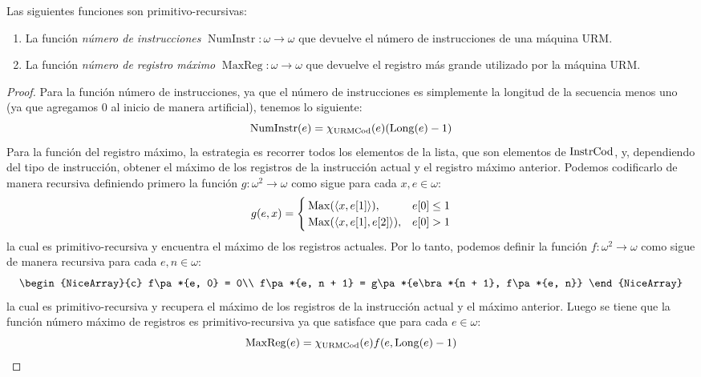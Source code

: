 \begin{theorem}
	\label{theo: numinstr_maxreg_primitivas} %
	Las siguientes funciones son primitivo-recursivas:

	\begin{enumerate}
		\item La función \emph{número de instrucciones} $\operatorname{NumInstr}:\omega\to\omega$ que devuelve el número de instrucciones de una máquina URM.
		\item La función \emph{número de registro máximo} $\operatorname{MaxReg}:\omega\to\omega$ que devuelve el registro más grande utilizado por la máquina URM.
	\end{enumerate}
\end{theorem}

\begin{proof}
	Para la función número de instrucciones, ya que el número de instrucciones es simplemente la longitud de la secuencia menos uno (ya que agregamos $0$ al inicio de manera artificial), tenemos lo siguiente:
	\[
		\operatorname{NumInstr}\pa*{e} =\CARACTERISTICA{\URMCODIGO}\pa*{e}\pa*{\LONGITUD\pa*{e} - 1}
	\]
	Para la función del registro máximo, la estrategia es recorrer todos los elementos de la lista, que son elementos de $\mathrm{InstrCod}$, y, dependiendo del tipo de instrucción, obtener el máximo de los registros de la instrucción actual y el registro máximo anterior. Podemos codificarlo de manera recursiva definiendo primero la función $g:\omega^{2}\to\omega$ como sigue para cada $x, e\in\omega$:
	\[
		g\pa*{e, x} =
		\begin{cases}
			\operatorname{Max}\pa*{\inner*{x, e\bra*{1}}}, & e\bra*{0}\leq 1\\
			\operatorname{Max}\pa*{\inner*{x, e\bra*{1}, e\bra*{2}}}, & e\bra*{0} > 1
		\end{cases}
	\]
	la cual es primitivo-recursiva y encuentra el máximo de los registros actuales. Por lo tanto, podemos definir la función $f:\omega^{2}\to\omega$ como sigue de manera recursiva para cada $e, n\in\omega$:
	\[
		\begin{NiceArray}{c}
			f\pa*{e, 0} = 0\\
			f\pa*{e, n + 1} = g\pa*{e\bra*{n + 1}, f\pa*{e, n}}
		\end{NiceArray}
	\]
	la cual es primitivo-recursiva y recupera el máximo de los registros de la instrucción actual y el máximo anterior. Luego se tiene que la función número máximo de registros es primitivo-recursiva ya que satisface que para cada $e\in\omega$:
	\[
		\operatorname{MaxReg}\pa*{e} =\CARACTERISTICA{\URMCODIGO}\pa*{e}f\pa*{e,\LONGITUD\pa*{e} - 1}
	\]
\end{proof}


